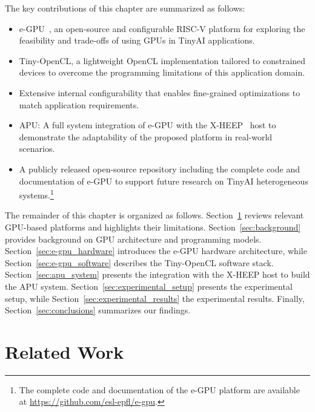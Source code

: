         The key contributions of this chapter are summarized as follows:

        \vspace{-1em}
        \begin{itemize}
            \item \mbox{e-GPU}~\cite{e-gpu}, an open-source and configurable RISC-V platform for exploring the feasibility and trade-offs of using GPUs in TinyAI applications.

            \item \mbox{Tiny-OpenCL}, a lightweight OpenCL implementation tailored to constrained devices to overcome the programming limitations of this application domain.
    
            \item Extensive internal configurability that enables fine-grained optimizations to match application requirements.

            \item \mbox{APU}: A full system integration of e-GPU with the \mbox{X-HEEP}~\cite{x-heep} host to demonstrate the adaptability of the proposed platform in real-world scenarios.
    
            \item A publicly released open-source repository including the complete code and documentation of \mbox{e-GPU} to support future research on TinyAI heterogeneous systems.\footnote{The complete code and documentation of the e-GPU platform are available at \url{https://github.com/esl-epfl/e-gpu}.}
        \end{itemize}
        \vspace{-1em}
        
        The remainder of this chapter is organized as follows. Section~\ref{sec:related_work} reviews relevant GPU-based platforms and highlights their limitations. Section~\ref{sec:background} provides background on GPU architecture and programming models. Section~\ref{sec:e-gpu_hardware} introduces the \mbox{e-GPU} hardware architecture, while Section~\ref{sec:e-gpu_software} describes the \mbox{Tiny-OpenCL} software stack. Section~\ref{sec:apu_system} presents the integration with the \mbox{X-HEEP} host to build the APU system. Section~\ref{sec:experimental_setup} presents the experimental setup, while Section~\ref{sec:experimental_results} the experimental results. Finally, Section~\ref{sec:conclusions} summarizes our findings.

    \section{Related Work}
    \label{sec:related_work}
    

